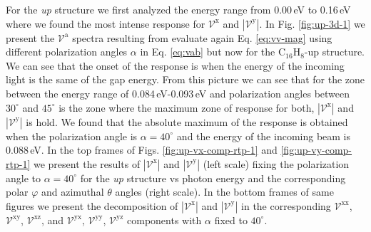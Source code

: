 \documentclass[prb,11pt,tightenlines,twocolumn,aps]{revtex4-1}
\begin{document}
For the \emph{up} structure we first analyzed the energy range from 0.00\,eV to
0.16\,eV where we found the most intense response for $\mathcal{V}^{\mathrm{x}}$
and $|\mathcal{V}^{\mathrm{y}}|$. In Fig. \ref{fig:up-3d-1} we present the
$\mathcal{V}^{\mathrm{a}}$ spectra resulting from evaluate again Eq. 
\eqref{eq:vv-mag} using different polarization angles $\alpha$ in Eq.  
\eqref{eq:vab} but now for the C$_{16}$H$_{8}$-up structure. We can see that the
onset of the response is when the energy of the incoming light is the same of
the gap energy.
% 
From this picture we can see that for the zone between the energy range of
0.084\,eV-0.093\,eV and polarization angles between $30^{\circ}$ and
$45^{\circ}$ is the zone where the maximum zone of response for both,
$|\mathcal{V}^{\mathrm{x}}|$ and $|\mathcal{V}^{\mathrm{y}}|$ is hold.
% 
We found that the absolute maximum of the response is obtained when the
polarization angle is $\alpha=40^{\circ}$ and the energy of the incoming beam is
0.088\,eV.
%
In the top frames of  Figs. \ref{fig:up-vx-comp-rtp-1} and 
% 
\ref{fig:up-vy-comp-rtp-1} we present the results of
$|\mathcal{V}^{\mathrm{x}}|$ and $|\mathcal{V}^{\mathrm{y}}|$ (left scale)
fixing the polarization angle to $\alpha=40^{\circ}$ for the \emph{up} structure
vs photon energy and the corresponding polar $\varphi$ and azimuthal $\theta$
angles (right scale). In the bottom frames of same figures we present the decomposition of
$|\mathcal{V}^{\mathrm{x}}|$ and $|\mathcal{V}^{\mathrm{y}}|$ in the
corresponding $\mathcal{V}^{\mathrm{xx}}$, 
$\mathcal{V}^{\mathrm{xy}}$,
$\mathcal{V}^{\mathrm{xz}}$, and
$\mathcal{V}^{\mathrm{yx}}$, 
$\mathcal{V}^{\mathrm{yy}}$,
$\mathcal{V}^{\mathrm{yz}}$ 
components with $\alpha$ fixed to $40^{\circ}$. 
\end{document}
